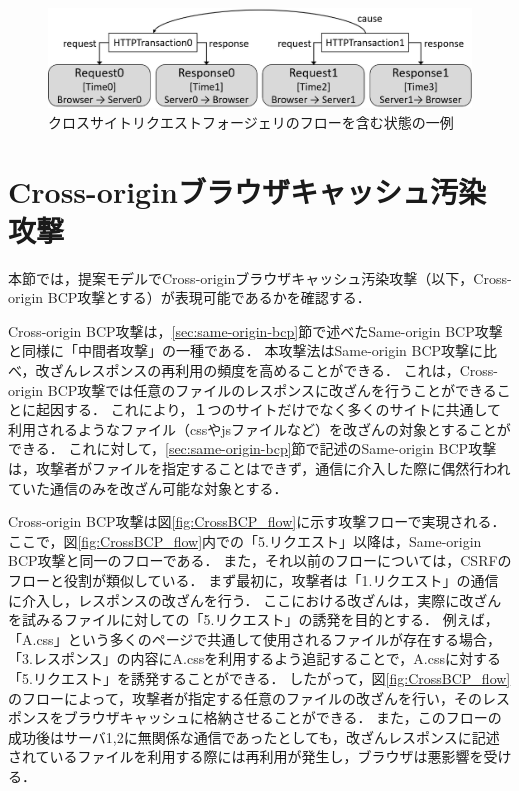 \documentclass[12pt,a4paper]{jbook}
\begin{document}
\begin{figure}[htb]
\centering
\includegraphics[width=450pt]{./fig/CSRF_alloy.eps}
\caption{クロスサイトリクエストフォージェリのフローを含む状態の一例}
\label{fig:CSRF_alloy}
\end{figure}

\section{Cross-originブラウザキャッシュ汚染攻撃}
本節では，提案モデルでCross-originブラウザキャッシュ汚染攻撃\cite{bcpattack}（以下，Cross-origin BCP攻撃とする）が表現可能であるかを確認する．

Cross-origin BCP攻撃は，\ref{sec:same-origin-bcp}節で述べたSame-origin BCP攻撃と同様に「中間者攻撃」の一種である．
本攻撃法はSame-origin BCP攻撃に比べ，改ざんレスポンスの再利用の頻度を高めることができる．
これは，Cross-origin BCP攻撃では任意のファイルのレスポンスに改ざんを行うことができることに起因する．
これにより，１つのサイトだけでなく多くのサイトに共通して利用されるようなファイル（cssやjsファイルなど）を改ざんの対象とすることができる．
これに対して，\ref{sec:same-origin-bcp}節で記述のSame-origin BCP攻撃は，攻撃者がファイルを指定することはできず，通信に介入した際に偶然行われていた通信のみを改ざん可能な対象とする．

Cross-origin BCP攻撃は図\ref{fig:CrossBCP_flow}に示す攻撃フローで実現される．
ここで，図\ref{fig:CrossBCP_flow}内での「5.リクエスト」以降は，Same-origin BCP攻撃と同一のフローである．
また，それ以前のフローについては，CSRFのフローと役割が類似している．
まず最初に，攻撃者は「1.リクエスト」の通信に介入し，レスポンスの改ざんを行う．
ここにおける改ざんは，実際に改ざんを試みるファイルに対しての「5.リクエスト」の誘発を目的とする．
例えば，「A.css」という多くのページで共通して使用されるファイルが存在する場合，「3.レスポンス」の内容にA.cssを利用するよう追記することで，A.cssに対する「5.リクエスト」を誘発することができる．
したがって，図\ref{fig:CrossBCP_flow}のフローによって，攻撃者が指定する任意のファイルの改ざんを行い，そのレスポンスをブラウザキャッシュに格納させることができる．
また，このフローの成功後はサーバ1,2に無関係な通信であったとしても，改ざんレスポンスに記述されているファイルを利用する際には再利用が発生し，ブラウザは悪影響を受ける．
\end{document}
